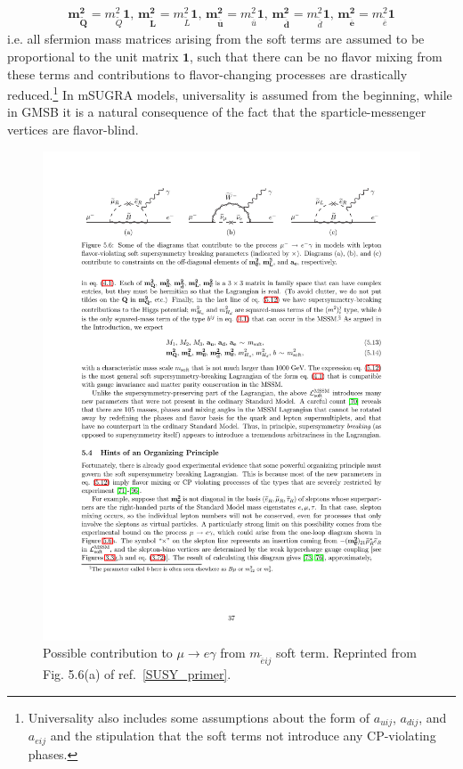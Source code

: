 \documentclass[dissertation.tex]{subfiles}
\begin{document}
\begin{eqnarray}
\label{eq:universailty_conditions}
\mathbf{m_{\widetilde{Q}}^{2}} = m_{\widetilde{Q}}^{2}\mathbf{1}\mbox{, }\mathbf{m_{\widetilde{L}}^{2}} = m_{\widetilde{L}}^{2}\mathbf{1}\mbox{, }\mathbf{m_{\widetilde{\overline{u}}}^{2}} = m_{\widetilde{\overline{u}}}^{2}\mathbf{1}\mbox{, }\mathbf{m_{\widetilde{\overline{d}}}^{2}} = m_{\widetilde{\overline{d}}}^{2}\mathbf{1}\mbox{, }\mathbf{m_{\widetilde{\overline{e}}}^{2}} = m_{\widetilde{\overline{e}}}^{2}\mathbf{1}
\end{eqnarray}
%
i.e. all sfermion mass matrices arising from the soft terms are assumed to be proportional to the unit matrix $\mathbf{1}$, such that there can be no flavor mixing from these terms and contributions to flavor-changing processes are drastically reduced.\footnote{Universality also includes some assumptions about the form of $a_{uij}$, $a_{dij}$, and $a_{eij}$ and the stipulation that the soft terms not introduce any CP-violating phases.}  In mSUGRA models, universality is assumed from the beginning, while in GMSB it is a natural consequence of the fact that the sparticle-messenger vertices are flavor-blind.

\begin{figure}
	\centering
	\includegraphics[scale=1.0]{muegamma}
	\caption{Possible contribution to $\mu\rightarrow e\gamma$ from $m_{\widetilde{\overline{e}}ij}$ soft term.  Reprinted from Fig. 5.6(a) of ref.~\ref{SUSY_primer}.}
	\label{fig:muegamma}
\end{figure}
\end{document}
